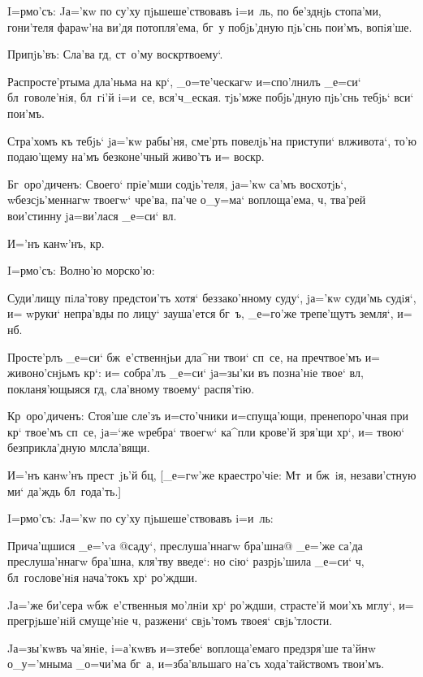 I=рмо'съ: Jа='кw по су'ху пjьшеше'ствовавъ i=и~ль, по 
бе'зднjь стопа'ми, гони'теля фараw'на ви'дя потопля'ема, 
бг~у побjь'дную пjь'снь пои'мъ, вопiя'ше.

Припjь'въ: Сла'ва гд, ст~о'му воскр твоему`. 

Распросте'ртыма дла'ньма на кр`, _о=те'ческагw 
и=спо'лнилъ _е=си` бл~говоле'нiя, бл~гi'й i=и~се, 
вся'ч_еская. тjь'мже побjь'дную пjь'снь тебjь` вси` 
пои'мъ. 

Стра'хомъ къ тебjь` jа='кw рабы'ня, сме'рть повелjь'на 
приступи` вл живота`, то'ю подаю'щему на'мъ 
безконе'чный живо'тъ и= воскр.

Бг~оро'диченъ: Своего` прiе'мши содjь'теля, jа='кw 
са'мъ восхотjь`, w\т безсjь'меннагw твоегw` чре'ва, па'че 
о_у=ма` воплоща'ема, ч, тва'рей вои'стинну 
jа=ви'лася _е=си` вл.

И='нъ канw'нъ, кр.

 I=рмо'съ: Волно'ю морско'ю:

Суди'лищу пiла'тову предстои'тъ хотя` беззако'нному 
суду`, jа='кw суди'мь судiя`, и= w\т руки` непра'вды по 
лицу` зауша'ется бг~ъ, _е=го'же трепе'щутъ земля`, и= 
нб.

Просте'рлъ _е=си` бж~е'ственнjьи дла^ни твои` сп~се, 
на преч твое'мъ и= живоно'снjьмъ кр`: и= 
собра'лъ _е=си` jа=зы'ки въ позна'нiе твое` вл, 
покланя'ющыяся гд, сла'вному твоему` распя'тiю.

Кр~оро'диченъ: Стоя'ше сле'зъ и=сто'чники 
и=спуща'ющи, пренепоро'чная при кр` твое'мъ сп~се, 
jа=`же w\т ребра` твоегw` ка^пли крове'й зря'щи хр`, 
и= твою` безприкла'дную мл сла'вящи.

И='нъ канw'нъ прест~jь'й бц, [_е=гw'же 
краестро'чiе: Мт~и бж~iя, незави'стную ми` да'ждь 
бл~года'ть.]

I=рмо'съ: Jа='кw по су'ху пjьшеше'ствовавъ i=и~ль:

Прича'щшися _е='vа @саду`, преслуша'ннагw бра'шна@ 
{_е='же са'да преслуша'ннагw бра'шна}, кля'тву введе`: но 
сiю` разрjь'шила _е=си` ч, бл~гослове'нiя нача'токъ 
хр` ро'ждши.

Jа='же би'сера w\т бж~е'ственныя мо'лнiи хр` 
ро'ждши, страсте'й мои'хъ мглу`, и= прегрjьше'нiй 
смуще'нiе ч, разжени` свjь'томъ твоея` свjь'тлости.

Jа=зы'кwвъ ча'янiе, i=а'кwвъ и=з\ъ тебе` воплоща'емаго 
предзря'ше та'йнw о_у='мныма _о=чи'ма бг~а, и=зба'вльшаго 
на'съ хода'тайствомъ твои'мъ. 

